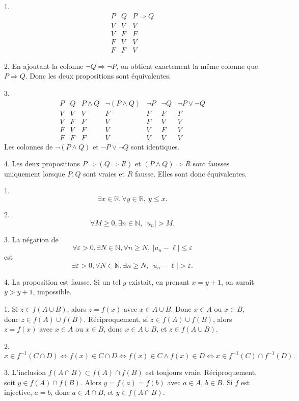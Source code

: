 \documentclass[11pt,a4paper]{article}
\newcommand{\N}{\mathbb{N}}
\newcommand{\R}{\mathbb{R}}
\newcommand{\non}{\neg}
\newcommand{\et}{\wedge}
\newcommand{\ou}{\vee}
\newcommand{\imp}{\Rightarrow}
\newcommand{\ssi}{\Longleftrightarrow}
\newcommand{\eps}{\varepsilon}
\begin{document}
\begin{correctionbox}[Exercice 1]
1.
\[
\begin{array}{c|c|c}
P&Q&P\imp Q\\
\hline
V&V&V\\
V&F&F\\
F&V&V\\
F&F&V
\end{array}
\]

2. En ajoutant la colonne \(\non Q\imp\non P\), on obtient exactement la même colonne que \(P\imp Q\). Donc les deux propositions sont équivalentes.

3.
\[
\begin{array}{c|c|c|c|c|c|c}
P&Q&P\et Q&\non(P\et Q)&\non P&\non Q&\non P\ou\non Q\\
\hline
V&V&V&F&F&F&F\\
V&F&F&V&F&V&V\\
F&V&F&V&V&F&V\\
F&F&F&V&V&V&V
\end{array}
\]
Les colonnes de \(\non(P\et Q)\) et \(\non P\ou\non Q\) sont identiques.

4. Les deux propositions \(P\imp(Q\imp R)\) et \((P\et Q)\imp R\) sont fausses uniquement lorsque \(P,Q\) sont vraies et \(R\) fausse. Elles sont donc équivalentes.
\end{correctionbox}

\begin{correctionbox}[Exercice 2]
1.
\[
\exists x\in\R,\forall y\in\R,\ y\leq x.
\]

2.
\[
\forall M\geq0,\exists n\in\N,\ |u_n|>M.
\]

3. La négation de
\[
\forall\eps>0,\exists N\in\N,\forall n\geq N,\ |u_n-\ell|\leq\eps
\]
est
\[
\exists\eps>0,\forall N\in\N,\exists n\geq N,\ |u_n-\ell|>\eps.
\]

4. La proposition est fausse. Si un tel \(y\) existait, en prenant \(x=y+1\), on aurait \(y>y+1\), impossible.
\end{correctionbox}

\begin{correctionbox}[Exercice 3]
1. Si \(z\in f(A\cup B)\), alors \(z=f(x)\) avec \(x\in A\cup B\). Donc \(x\in A\) ou \(x\in B\), donc \(z\in f(A)\cup f(B)\). Réciproquement, si \(z\in f(A)\cup f(B)\), alors \(z=f(x)\) avec \(x\in A\) ou \(x\in B\), donc \(x\in A\cup B\), et \(z\in f(A\cup B)\).

2.
\[
x\in f^{-1}(C\cap D)
\ssi f(x)\in C\cap D
\ssi f(x)\in C\et f(x)\in D
\ssi x\in f^{-1}(C)\cap f^{-1}(D).
\]

3. L'inclusion \(f(A\cap B)\subset f(A)\cap f(B)\) est toujours vraie. Réciproquement, soit \(y\in f(A)\cap f(B)\). Alors \(y=f(a)=f(b)\) avec \(a\in A\), \(b\in B\). Si \(f\) est injective, \(a=b\), donc \(a\in A\cap B\), et \(y\in f(A\cap B)\).
\end{correctionbox}
\end{document}
